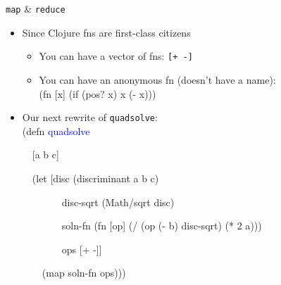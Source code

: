 \documentclass{beamer}
\begin{document}
\begin{frame}[allowframebreaks]{\texttt{map} \& \texttt{reduce}}
\begin{itemize}
  \framebreak
  \item Since Clojure fns are first-class citizens
    \begin{itemize}
    \item You can have a vector of fns: \texttt{[+ -]}
    \item You can have an anonymous fn (doesn't have a name):\\
{\ttfamily\color{black}
%
\textcolor[rgb]{0.54901963,0.54901963,0.54901963}{(}\textcolor[rgb]{0.49803922,0.0,0.49803922}{fn}
[x]
\textcolor[rgb]{0.54901963,0.54901963,0.54901963}{(}\textcolor[rgb]{0.49803922,0.0,0.49803922}{if}
\textcolor[rgb]{0.54901963,0.54901963,0.54901963}{(}\textcolor[rgb]{0.28235295,0.23921569,0.54509807}{pos?}
x\textcolor[rgb]{0.54901963,0.54901963,0.54901963}{)} x
\textcolor[rgb]{0.54901963,0.54901963,0.54901963}{(}\textcolor[rgb]{0.28235295,0.23921569,0.54509807}{{}-}
x\textcolor[rgb]{0.54901963,0.54901963,0.54901963}{)))}}
    \end{itemize}
  \item Our next rewrite of \texttt{quadsolve}:\\
{\ttfamily\color{black}
%
\textcolor[rgb]{0.54901963,0.54901963,0.54901963}{(}\textcolor[rgb]{0.49803922,0.0,0.49803922}{defn}
\textcolor{blue}{quadsolve}}

{\ttfamily\color{black}
\ \ [a b c]}

{\ttfamily\color{black}
\ \ \textcolor[rgb]{0.54901963,0.54901963,0.54901963}{(}\textcolor[rgb]{0.49803922,0.0,0.49803922}{let}
[disc \textcolor[rgb]{0.54901963,0.54901963,0.54901963}{(}discriminant
a b c\textcolor[rgb]{0.54901963,0.54901963,0.54901963}{)}}

{\ttfamily\color{black}
\ \ \ \ \ \ \ \ disc-sqrt
\textcolor[rgb]{0.54901963,0.54901963,0.54901963}{(}\textcolor[rgb]{0.28235295,0.23921569,0.54509807}{Math/sqrt}
disc\textcolor[rgb]{0.54901963,0.54901963,0.54901963}{)}}

{\ttfamily\color{black}
\ \ \ \ \ \ \ \ soln-fn
\textcolor[rgb]{0.54901963,0.54901963,0.54901963}{(}\textcolor[rgb]{0.49803922,0.0,0.49803922}{fn}
[op]
\textcolor[rgb]{0.54901963,0.54901963,0.54901963}{(}\textcolor[rgb]{0.28235295,0.23921569,0.54509807}{/}
\textcolor[rgb]{0.54901963,0.54901963,0.54901963}{(}op
\textcolor[rgb]{0.54901963,0.54901963,0.54901963}{(}\textcolor[rgb]{0.28235295,0.23921569,0.54509807}{{}-}
b\textcolor[rgb]{0.54901963,0.54901963,0.54901963}{)}
disc-sqrt\textcolor[rgb]{0.54901963,0.54901963,0.54901963}{)}
\textcolor[rgb]{0.54901963,0.54901963,0.54901963}{(}\textcolor[rgb]{0.28235295,0.23921569,0.54509807}{*}
2 a\textcolor[rgb]{0.54901963,0.54901963,0.54901963}{)))}}

{\ttfamily\color{black}
\ \ \ \ \ \ \ \ ops [+ -]]}

{\ttfamily\color{black}
\ \ \ \ \textcolor[rgb]{0.54901963,0.54901963,0.54901963}{(}\textcolor[rgb]{0.28235295,0.23921569,0.54509807}{map}
soln-fn ops\textcolor[rgb]{0.54901963,0.54901963,0.54901963}{)))}}
  \end{itemize}
\end{frame}
\end{document}
